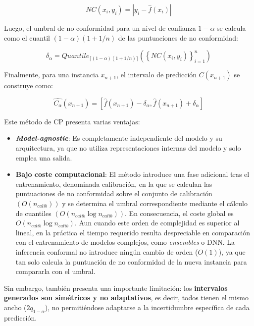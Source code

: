 $$
NC(x_i, y_i) = | y_i - \hat{f}(x_i) |
$$

Luego, el umbral de no conformidad para un nivel de confianza $1-\alpha$ se calcula como el cuantil $(1-\alpha)(1+1/n)$ de las puntuaciones de no conformidad:

$$
\delta_\alpha = Quantile_{ \lceil  (1-\alpha) (1 + 1/n)  \rceil } ( \left\{ NC(x_i,y_i) \right\}_{i=1}^n )
$$

Finalmente, para una instancia $x_{n+1}$, el intervalo de predicción $C(x_{n+1})$ se construye como: 

$$
\hat{C_\alpha}(x_{n+1}) = \left[ \hat{f}(x_{n+1}) - \delta_\alpha, \hat{f}(x_{n+1}) + \delta_\alpha\right]
$$

Este método de \acrshort{CP} presenta varias ventajas: 

\begin{itemize}

    \item \textbf{\textit{Model-agnostic}}: Es completamente independiente del modelo y su arquitectura, ya que no utiliza representaciones internas del modelo y solo emplea una salida.  
    
    \item \textbf{Bajo coste computacional}: El método introduce una fase adicional tras el entrenamiento, denominada calibración, en la que se calculan las puntuaciones de no conformidad sobre el conjunto de calibración $\left( O(n_{calib}) \right)$ y se determina el umbral correspondiente mediante el cálculo de cuantiles $\left( O(n_{calib} \log n_{calib}) \right)$. En consecuencia, el coste global es $O(n_{calib} \log n_{calib})$. Aun cuando este orden de complejidad es superior al lineal, en la práctica el tiempo requerido resulta despreciable en comparación con el entrenamiento de modelos complejos, como \textit{ensembles} o \acrshort{DNN}. La inferencia conformal no introduce ningún cambio de orden ($O(1)$), ya que tan solo calcula la puntuación de no conformidad de la nueva instancia para compararla con el umbral. 

\end{itemize}

Sin embargo, también presenta una importante limitación: los \textbf{intervalos generados son simétricos y no adaptativos}, es decir, todos tienen el mismo ancho ($2q_{1-\alpha}$), no permitiéndose adaptarse a la incertidumbre específica de cada predicción.

    
